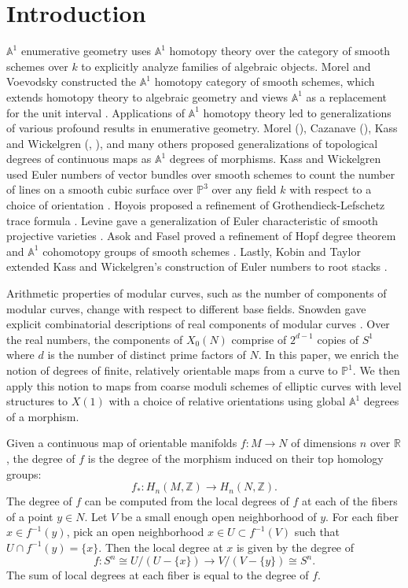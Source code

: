 \documentclass[12pt, reqno]{amsart}
\theoremstyle{definition}
\newcommand{\A}{\mathbb{A}} %
\newcommand{\Proj}{\mathbb{P}} %
\begin{document}
\section{Introduction}\label{sec: Introduction}
$\A^1$ enumerative geometry uses $\A^1$ homotopy theory over the category of smooth schemes over $k$ to explicitly analyze families of algebraic objects. Morel and Voevodsky constructed the $\A^1$ homotopy category of smooth schemes, which extends homotopy theory to algebraic geometry and views $\A^1$ as a replacement for the unit interval \cite{mv}.  
Applications of $\A^1$ homotopy theory led to generalizations of various profound results in enumerative geometry. Morel (\cite{morel06}), Cazanave (\cite{cazanave}), Kass and Wickelgren (\cite{kwEKL},  \cite{kwBezout}), and many others proposed generalizations of topological degrees of continuous maps as $\A^1$ degrees of morphisms. Kass and Wickelgren used Euler numbers of vector bundles over smooth schemes to count the number of lines on a smooth cubic surface over $\Proj^3$ over any field $k$ with respect to a choice of orientation \cite{kwcubic}. Hoyois proposed a refinement of Grothendieck-Lefschetz trace formula \cite{hoyois}. Levine gave a generalization of Euler characteristic of smooth projective varieties \cite{levine}. Asok and Fasel proved a refinement of Hopf degree theorem and $\A^1$ cohomotopy groups of smooth schemes \cite{af18}. Lastly, Kobin and Taylor extended Kass and Wickelgren's construction of Euler numbers to root stacks \cite{tkstack}.

Arithmetic properties of modular curves, such as the number of components of modular curves, change with respect to different base fields. Snowden gave explicit combinatorial descriptions of real components of modular curves \cite{snowden}. Over the real numbers, the components of $X_0(N)$ comprise of $2^{d-1}$ copies of $S^1$ where $d$ is the number of distinct prime factors of $N$. In this paper, we enrich the notion of degrees of finite, relatively orientable maps from a curve to $\Proj^1$. We then apply this notion to maps from coarse moduli schemes of elliptic curves with level structures to $X(1)$ with a choice of relative orientations using global $\A^1$ degrees of a morphism.

Given a continuous map of orientable manifolds $f: M \to N$ of dimensions $n$ over $\mathbb{R}$, the degree of $f$ is the degree of the morphism induced on their top homology groups:
\begin{equation*}
    f_* : H_n(M, \mathbb{Z}) \to H_n(N, \mathbb{Z}).
\end{equation*}
The degree of $f$ can be computed from the local degrees of $f$ at each of the fibers of a point $y \in N$. Let $V$ be a small enough open neighborhood of $y$. For each fiber $x \in f^{-1}(y)$, pick an open neighborhood $x \in U \subset f^{-1}(V)$ such that $U \cap f^{-1}(y) = \{x\}$. Then the local degree at $x$ is given by the degree of
\begin{equation*}
    f: S^n \cong U / (U - \{x\}) \to V / (V - \{y\}) \cong S^n.
\end{equation*}
The sum of local degrees at each fiber is equal to the degree of $f$. 
\end{document}
